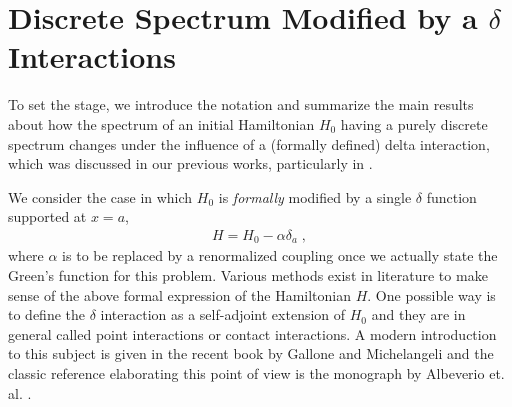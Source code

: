 \documentclass[amsmath,amssymb,14pt]{article}
\numberwithin{equation}{section}
\begin{document}
\section{Discrete Spectrum Modified by a  $\delta$ Interactions} \label{section2}

To set the stage, we introduce the notation and summarize the main results about how the spectrum of an initial Hamiltonian $H_0$ having a purely discrete spectrum changes under the influence of a (formally defined) delta interaction,  which was discussed in our previous works, particularly in \cite{Annals23}. 

 


We consider the case in which $H_0$ is {\it formally} modified by a single $\delta$ function supported at $x=a$,
%
\begin{eqnarray}
    H=H_0 - \alpha \delta_a \;, \label{Hamiltonian}
\end{eqnarray}
%
where $\alpha$ is to be replaced by a renormalized coupling once we actually state the Green's function for this problem. Various methods exist in literature to make sense of the above formal expression of the Hamiltonian $H$. One possible way is to define the $\delta$ interaction as a self-adjoint extension of $H_0$ and they are in general called point interactions or contact interactions. A modern introduction to this subject is given in the recent book by Gallone and Michelangeli \cite{allesandro} and the classic reference elaborating this point of view is the monograph by Albeverio et. al. \cite{Albeverio2012solvable}. 
\end{document}
